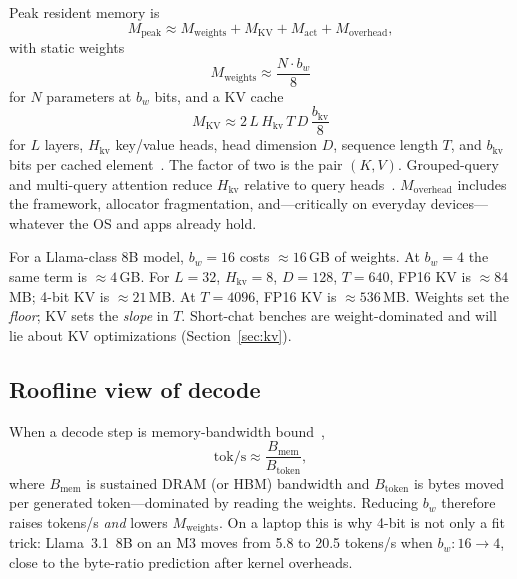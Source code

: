 Peak resident memory is
\begin{equation}
  M_{\mathrm{peak}} \approx M_{\mathrm{weights}} + M_{\mathrm{KV}} + M_{\mathrm{act}} + M_{\mathrm{overhead}},
  \label{eq:peak}
\end{equation}
with static weights
\begin{equation}
  M_{\mathrm{weights}} \approx \frac{N \cdot b_w}{8}
  \label{eq:weights}
\end{equation}
for \(N\) parameters at \(b_w\) bits, and a KV cache
\begin{equation}
  M_{\mathrm{KV}} \approx 2\, L\, H_{\mathrm{kv}}\, T\, D\, \frac{b_{\mathrm{kv}}}{8}
  \label{eq:kv}
\end{equation}
for \(L\) layers, \(H_{\mathrm{kv}}\) key/value heads, head dimension \(D\), sequence length \(T\), and \(b_{\mathrm{kv}}\) bits per cached element~\citep{pope2022efficiently,ainslie2023gqa}. The factor of two is the pair \((K,V)\). Grouped-query and multi-query attention reduce \(H_{\mathrm{kv}}\) relative to query heads~\citep{shazeer2019mqa,ainslie2023gqa}. \(M_{\mathrm{overhead}}\) includes the framework, allocator fragmentation, and---critically on everyday devices---whatever the OS and apps already hold.

For a Llama-class 8B model, \(b_w = 16\) costs \(\approx 16\)\,GB of weights. At \(b_w = 4\) the same term is \(\approx 4\)\,GB. For \(L=32\), \(H_{\mathrm{kv}}=8\), \(D=128\), \(T=640\), FP16 KV is \(\approx 84\)\,MB; 4-bit KV is \(\approx 21\)\,MB. At \(T=4096\), FP16 KV is \(\approx 536\)\,MB. Weights set the \emph{floor}; KV sets the \emph{slope} in \(T\). Short-chat benches are weight-dominated and will lie about KV optimizations (Section~\ref{sec:kv}).

\subsection{Roofline view of decode}

When a decode step is memory-bandwidth bound~\citep{williams2009roofline},
\begin{equation}
  \mathrm{tok/s} \approx \frac{B_{\mathrm{mem}}}{B_{\mathrm{token}}},
  \label{eq:roofline}
\end{equation}
where \(B_{\mathrm{mem}}\) is sustained DRAM (or HBM) bandwidth and \(B_{\mathrm{token}}\) is bytes moved per generated token---dominated by reading the weights. Reducing \(b_w\) therefore raises tokens/s \emph{and} lowers \(M_{\mathrm{weights}}\). On a laptop this is why 4-bit is not only a fit trick: Llama~3.1~8B on an M3 moves from 5.8 to 20.5 tokens/s when \(b_w: 16 \to 4\), close to the byte-ratio prediction after kernel overheads.

